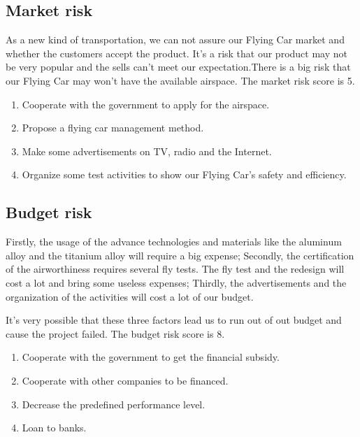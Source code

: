 \subsection{Market risk}

As a new kind of transportation, we can not assure our Flying Car market and whether the customers accept the product. It’s a risk that our product may not be very popular and the sells can’t meet our expectation.There is a big risk that our Flying Car may won’t have the available airspace. The market risk score is 5.

\begin{enumerate}
\item Cooperate with the government to apply for the airspace.

\item Propose a flying car management method.

\item Make some advertisements on TV, radio and the Internet.

\item Organize some test activities to show our Flying Car’s safety and efficiency.
\end{enumerate}

\subsection{Budget risk}

Firstly, the usage of the advance technologies and materials like the aluminum alloy and the titanium alloy will require a big expense; Secondly, the certification of the airworthiness requires several fly tests. The fly test and the redesign will cost a lot and bring some useless expenses; Thirdly, the advertisements and the organization of the activities will cost a lot of our budget.

It’s very possible that these three factors lead us to run out of out budget and cause the project failed. The budget risk score is 8.

\begin{enumerate}
\item Cooperate with the government to get the financial subsidy.

\item Cooperate with other companies to be financed.

\item Decrease the predefined performance level.

\item Loan to banks.
\end{enumerate}


